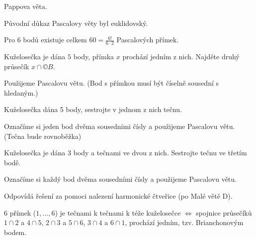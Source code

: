 \documentclass[12pt]{article}					%
\begin{document}
\begin{dusledek}
	Pappova věta.
\end{dusledek}

\begin{poznamka}[Historická]
	Původní důkaz Pascalovy věty byl euklidovský.
\end{poznamka}

\begin{poznamka}
	Pro $6$ bodů existuje celkem $60 = \frac{6!}{6·2}$ Pascalových přímek.
\end{poznamka}

\begin{priklad}[Konstrukce]
	Kuželosečka je dána $5$ body, přímka $x$ prochází jedním z nich. Najděte druhý průsečík $x \cap ©B$.

	\begin{reseni}
		Použijeme Pascalovu větu. (Bod s přímkou musí být číselně sousední s hledaným.)
	\end{reseni}
\end{priklad}

\begin{priklad}[Konstrukce]
	Kuželosečka dána 5 body, sestrojte v jednom z nich tečnu.

	\begin{reseni}
		Označíme si jeden bod dvěma sousedními čísly a použijeme Pascalovu větu. (Tečna bude rovnoběžka)
	\end{reseni}
\end{priklad}

\begin{priklad}[Konstrukce]
	Kuželosečka je dána 3 body a tečnami ve dvou z nich. Sestrojte tečnu ve třetím bodě.

	\begin{reseni}
		Označíme si každý bod dvěma sousedními čísly a použijeme Pascalovu větu.
	\end{reseni}

	\begin{poznamkain}
		Odpovídá řešení za pomoci nalezení harmonické čtveřice (po Malé větě D).
	\end{poznamkain}
\end{priklad}

\begin{veta}
	6 přímek ($1, …, 6$) je tečnami k tečnami k téže kuželosečce $\Leftrightarrow$ spojnice průsečíků $1 \cap 2$ a $4 \cap 5$, $2 \cap 3$ a $5 \cap 6$, $3 \cap 4$ a $6 \cap 1$, prochází jedním, tzv. Brianchonovým bodem.
\end{veta}
\end{document}
